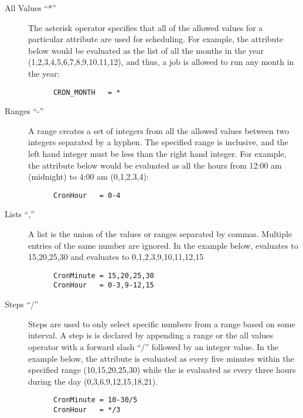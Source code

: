 \begin{description}
   \item[All Values ``*'']
   The asterisk operator specifies that all of the allowed values for a
   particular attribute are used for scheduling. For example, the 
    attribute below would be evaluated as the list of
   all the months in the year (1,2,3,4,5,6,7,8,9,10,11,12), and thus, a job
   is allowed to run any month in the year:
   
   \begin{verbatim}
      CRON_MONTH   = *
   \end{verbatim}

   \item[Ranges ``-'']
   A range creates a set of integers from all the allowed values between two
   integers separated by a hyphen. The specified range is inclusive, and the
   left hand integer must be less than the right hand integer. For example,
   the  attribute below would be evaluated as all the
   hours from 12:00 am (midnight) to 4:00 am (0,1,2,3,4):
   
   \begin{verbatim}
      CronHour   = 0-4
   \end{verbatim}
   
   \item[Lists ``,'']
   A list is the union of the values or ranges separated by commas. Multiple
   entries of the same number are ignored. In the example below,
    evaluates to 15,20,25,30 and 
   evaluates to 0,1,2,3,9,10,11,12,15
   
   \begin{verbatim}
      CronMinute = 15,20,25,30
      CronHour   = 0-3,9-12,15
   \end{verbatim}
      
   \item[Steps ``/'']
   Steps are used to only select specific numbers from a range based on 
   some interval. A step is is declared by appending a range or the all
   values operator with a forward slash ``/'' followed by an integer
   value. In the example below, the 
   attribute is evaluated as every five minutes within the specified
   range (10,15,20,25,30) while the  is evaluated as 
   every three hours during the day (0,3,6,9,12,15,18,21).
   
   \begin{verbatim}
      CronMinute = 10-30/5
      CronHour   = */3
   \end{verbatim}

\end{description}

